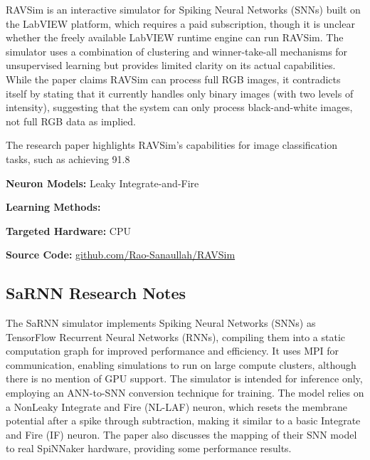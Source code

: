 RAVSim is an interactive simulator for Spiking Neural Networks (SNNs) built on the LabVIEW platform, which requires a paid subscription, though it is unclear whether the freely available LabVIEW runtime engine can run RAVSim. The simulator uses a combination of clustering and winner-take-all mechanisms for unsupervised learning but provides limited clarity on its actual capabilities. While the paper claims RAVSim can process full RGB images, it contradicts itself by stating that it currently handles only binary images (with two levels of intensity), suggesting that the system can only process black-and-white images, not full RGB data as implied.

The research paper highlights RAVSim's capabilities for image classification tasks, such as achieving 91.8%

\begin{tcolorbox}[enhanced,attach boxed title to top center={yshift=-3mm,yshifttext=-1mm}, colback=blue!5!white,colframe=blue!75!black,colbacktitle=red!80!black, title=RAVSim at a Glance,fonttitle=\bfseries, boxed title style={size=small,colframe=red!50!black} ]

\textbf{Neuron Models:} Leaky Integrate-and-Fire

\textbf{Learning Methods:}   

\textbf{Targeted Hardware:} CPU 

\textbf{Source Code:} \href{https://github.com/Rao-Sanaullah/RAVSim}{github.com/Rao-Sanaullah/RAVSim}
\end{tcolorbox}
\subsection*{SaRNN Research Notes}\label{SaRNN}

The SaRNN simulator implements Spiking Neural Networks (SNNs) as TensorFlow Recurrent Neural Networks (RNNs), compiling them into a static computation graph for improved performance and efficiency. It uses MPI for communication, enabling simulations to run on large compute clusters, although there is no mention of GPU support. The simulator is intended for inference only, employing an ANN-to-SNN conversion technique for training. The model relies on a NonLeaky Integrate and Fire (NL-LAF) neuron, which resets the membrane potential after a spike through subtraction, making it similar to a basic Integrate and Fire (IF) neuron. The paper also discusses the mapping of their SNN model to real SpiNNaker hardware, providing some performance results.

